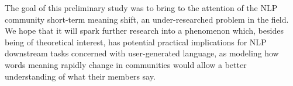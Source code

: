 
The goal of this preliminary study was to bring to the attention of the NLP community short-term meaning shift, an under-researched problem in the field. 
We hope that it will spark further research into a phenomenon which, besides being of theoretical interest, has potential practical implications for NLP downstream tasks concerned with user-generated language,
as modeling how words meaning rapidly change in communities would allow a better understanding of what their members say.




